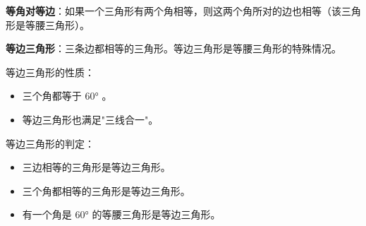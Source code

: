 \begin{understand}
\textbf{等角对等边}：如果一个三角形有两个角相等，则这两个角所对的边也相等（该三角形是等腰三角形）。

\textbf{等边三角形}：三条边都相等的三角形。等边三角形是等腰三角形的特殊情况。

等边三角形的性质：
\begin{itemize}
  \item 三个角都等于 $60°$ 。
  \item 等边三角形也满足"三线合一"。
\end{itemize}


等边三角形的判定：
\begin{itemize}
  \item 三边相等的三角形是等边三角形。
  \item 三个角都相等的三角形是等边三角形。
  \item 有一个角是 $60°$ 的等腰三角形是等边三角形。
\end{itemize}


\end{understand}

